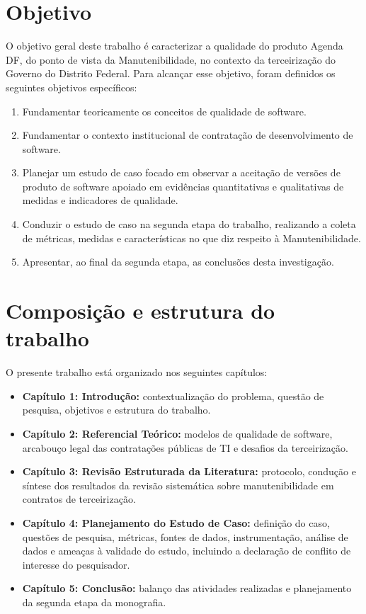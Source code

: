 \section{Objetivo}

O objetivo geral deste trabalho é caracterizar a qualidade do produto Agenda DF, do ponto de vista da Manutenibilidade, no contexto da terceirização do Governo do Distrito Federal. Para alcançar esse objetivo, foram definidos os seguintes objetivos específicos:

\begin{enumerate}
	\item Fundamentar teoricamente os conceitos de qualidade de software.
	\item Fundamentar o contexto institucional de contratação de desenvolvimento de software.
	\item Planejar um estudo de caso focado em observar a aceitação de versões de produto de software apoiado em evidências quantitativas e qualitativas de medidas e indicadores de qualidade.
	\item Conduzir o estudo de caso na segunda etapa do trabalho, realizando a coleta de métricas, medidas e características no que diz respeito à Manutenibilidade.
	\item Apresentar, ao final da segunda etapa, as conclusões desta investigação.
\end{enumerate}

\section{Composição e estrutura do trabalho}

O presente trabalho está organizado nos seguintes capítulos:

\begin{itemize}[leftmargin=2cm]
	\item \textbf{Capítulo 1: Introdução:} contextualização do problema, questão de pesquisa, objetivos e estrutura do trabalho.
	\item \textbf{Capítulo 2: Referencial Teórico:} modelos de qualidade de software, arcabouço legal das contratações públicas de TI e desafios da terceirização.
	\item \textbf{Capítulo 3: Revisão Estruturada da Literatura:} protocolo, condução e síntese dos resultados da revisão sistemática sobre manutenibilidade em contratos de terceirização.
	\item \textbf{Capítulo 4: Planejamento do Estudo de Caso:} definição do caso, questões de pesquisa, métricas, fontes de dados, instrumentação, análise de dados e ameaças à validade do estudo, incluindo a declaração de conflito de interesse do pesquisador.
	\item \textbf{Capítulo 5: Conclusão:} balanço das atividades realizadas e planejamento da segunda etapa da monografia.
\end{itemize}

